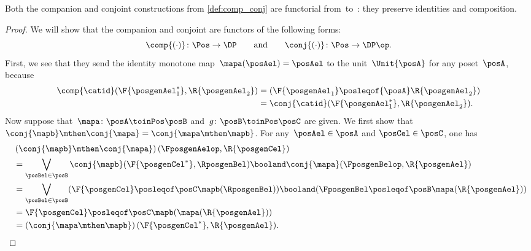 \begin{lemma}
    \label{lem:comp_conj}
    Both the companion and conjoint constructions from \cref{def:comp_conj} are functorial from~\Pos to~\DP: they preserve identities and composition.
\end{lemma}
\begin{proof}
    We will show that the companion and conjoint are functors of the following forms:
    \begin{equation}
        \comp{(\cdot)}\colon\Pos\to\DP
        \qquad\text{and}\qquad
        \conj{(\cdot)}\colon\Pos\to\DP\op.
    \end{equation}
    First, we see that they send the identity monotone map~$\mapa(\posAel)=\posAel$ to the unit~$\Unit{\posA }$ for any poset~$\posA$, because
    \begin{equation}
        \begin{aligned}
            \comp{\catid}(\F{\posgenAel_1^*},\R{\posgenAel_2}) & = (\F{\posgenAel_1} \posleqof{\posA} \R{\posgenAel_2}) \\
                                                               & =\conj{\catid}(\F{\posgenAel_1^*},\R{\posgenAel_2}).
        \end{aligned}
    \end{equation}
    Now suppose that~$\mapa\colon  \posA \toinPos \posB $ and~$g\colon \posB \toinPos \posC$ are given.
    We first show that $\conj{\mapb}\mthen\conj{\mapa}=\conj{\mapa\mthen \mapb}$.
    For any~$\posAel\in \posA$ and $\posCel\in \posC$, one has
    \begin{equation}
        \begin{aligned}
          ~&  \left(\conj{\mapb}\mthen \conj{\mapa}\right)(\FposgenAelop,\R{\posgenCel})\\
             & =\bigvee_{\posBel\in \posB} \conj{\mapb}(\F{\posgenCel^*},\RposgenBel)\booland\conj{\mapa}(\FposgenBelop,\R{\posgenAel})                 \\
             & =\bigvee_{\posBel\in \posB} (\F{\posgenCel}\posleqof\posC \mapb(\RposgenBel)) \booland (\FposgenBel\posleqof\posB \mapa(\R{\posgenAel})) \\
             & = \F{\posgenCel}\posleqof\posC \mapb(\mapa(\R{\posgenAel}))                                                                              \\
             & =\left(\conj{\mapa\mthen \mapb}\right)(\F{\posgenCel^*},\R{\posgenAel}).
        \end{aligned}
    \end{equation}

\end{proof}
